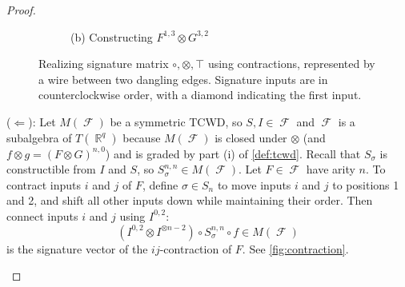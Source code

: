 \documentclass{article}
\theoremstyle{remark}
\theoremstyle{definition}
\DeclareMathOperator{\rr}{\mathbb{R}}
\DeclareMathOperator{\vx}{\mathbf{x}}
\DeclareMathOperator{\fc}{\mathcal{F}}
\begin{document}
\begin{proof}
\begin{figure}[ht!]
\begin{center}
\begin{subfigure}{0.4\textwidth}
             \caption*{(b) Constructing $F^{1,3}\otimes G^{3,2}$}
        \end{subfigure}
        \end{center}
        \caption{Realizing signature matrix $\circ,\otimes,\top$ using contractions,
            represented by a wire between two dangling edges. Signature inputs are in
        counterclockwise order, with a diamond indicating the first input.}
        \label{fig:ops_contraction}
    \end{figure} 
    ($\Longleftarrow$): Let $M(\fc)$ be a symmetric TCWD, so $S,I \in \fc$ and
    $\fc$ is a subalgebra of $T(\rr^q)$ because $M(\fc)$ is closed under $\otimes$ 
    (and $f \otimes g = (F \otimes G)^{n,0}$)
    and is graded by part (i) of \autoref{def:tcwd}. 
    Recall that $S_\sigma$ is constructible from $I$ and $S$, so $S_{\sigma}^{n,n} \in M(\fc)$. 
    Let $F \in \fc$ have arity $n$.
    To contract inputs $i$ and $j$ of $F$, define $\sigma \in S_n$ to move inputs $i$
    and $j$ to positions 1 and 2, and shift all other inputs down while maintaining their order.
    Then connect inputs $i$ and $j$ using $I^{0,2}$: 
    \begin{equation}
        (I^{0,2} \otimes I^{\otimes n-2}) \circ S_{\sigma}^{n,n} \circ f
        \in M(\fc)
        \label{eq:contraction}
    \end{equation}
    is the signature vector of the $ij$-contraction of $F$. See \autoref{fig:contraction}.
    \begin{figure}[ht!]
        \centering
\end{figure}
\end{proof}
\end{document}
